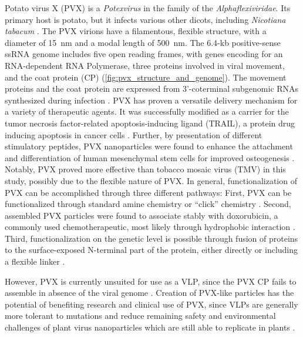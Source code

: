 %
%
Potato virus X (PVX) is a \emph{Potexvirus} in the family of the \emph{Alphaflexiviridae}. Its primary host is potato, but it infects various other dicots, including \emph{Nicotiana tabacum} \cite{pvx_hosts}. The PVX virions have a filamentous, flexible structure, with a diameter of \SI{15}{\nano\meter} and a modal length of \SI{500}{\nano\meter}. The 6.4-kb positive-sense ssRNA genome includes five open reading frames, with genes encoding for an RNA-dependent RNA Polymerase, three proteins involved in viral movement, and the coat protein (CP) \cite{Grinzato2020} (\autoref{fig:pvx_structure_and_genome}). The movement proteins and the coat protein are expressed from 3'-coterminal subgenomic RNAs synthesized during infection \cite{pvx_subgenomic_rnas}. PVX has proven a versatile delivery mechanism for a variety of therapeutic agents. It was successfully modified as a carrier for the tumor necrosis factor-related apoptosis-inducing ligand (TRAIL), a protein drug inducing apoptosis in cancer cells \cite{pvx_trail}. Further, by presentation of different stimulatory peptides, PVX nanoparticles were found to enhance the attachment and differentiation of human mesenchymal stem cells for improved osteogenesis \cite{plant_virus_bone}. Notably, PVX proved more effective than tobacco mosaic virus (TMV) in this study, possibly due to the flexible nature of PVX. 
In general, functionalization of PVX can be accomplished through three different pathways: 
First, PVX can be functionalized through standard amine chemistry or ``click'' chemistry \cite{pvx_chemical_modification}. Second, assembled PVX particles were found to associate stably with doxorubicin, a commonly used chemotherapeutic, most likely through hydrophobic interaction \cite{pvx_doxorubicin}. Third, functionalization on the genetic level is possible through fusion of proteins to the surface-exposed N-terminal part of the protein, either directly or including a flexible linker \cite{pvx_genetic_engineering}. 

However, PVX is currently unsuited for use as a VLP, since the PVX CP fails to assemble in absence of the viral genome \cite{juli_sagt_keine_assembly}. Creation of PVX-like particles has the potential of benefiting research and clinical use of PVX, since VLPs are generally more tolerant to mutations \cite{plant_vlps_better} and reduce remaining safety and environmental challenges of plant virus nanoparticles which are still able to replicate in plants \cite{plant_viruses_remaining_risk}. 

